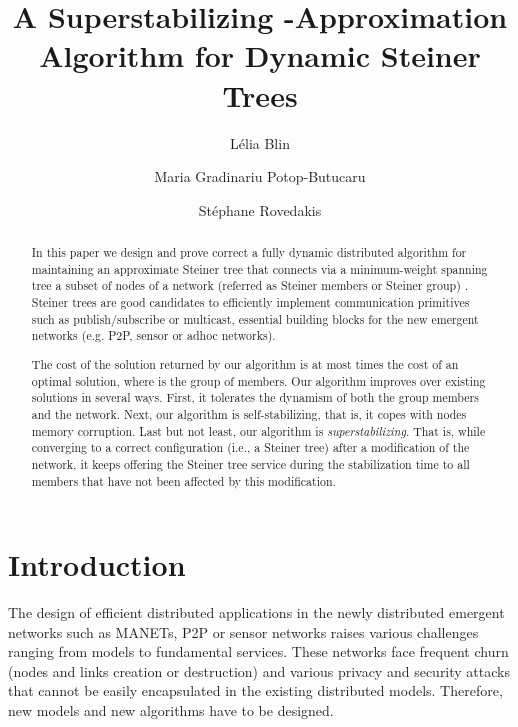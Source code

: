 \documentclass[11pt]{article}
\begin{document}
\title{A Superstabilizing -Approximation Algorithm for Dynamic Steiner Trees}

\author{
L\'{e}lia Blin 
\and
Maria Gradinariu Potop-Butucaru
\and
St\'{e}phane Rovedakis
}



\date{}


\maketitle

\begin{abstract}
In this paper we design and prove correct a fully dynamic distributed algorithm for maintaining an approximate Steiner 
 tree that connects via a minimum-weight spanning tree a 
subset of nodes of a network (referred as Steiner members or Steiner group) .
Steiner trees are good 
candidates to efficiently implement communication primitives such
as publish/subscribe or multicast, essential building blocks for the new
emergent networks (e.g. P2P, sensor or adhoc networks). 

The cost
of the solution returned by our algorithm is at most 
times the cost of an optimal solution, where  is the group of
members. Our algorithm improves over existing solutions in several
ways. First, it tolerates the dynamism of both the group members and
the network. Next, our algorithm is self-stabilizing, that is, it
copes with nodes memory
corruption. Last but not least, our algorithm is
\emph{superstabilizing}. 
That is, while converging to a correct
configuration (i.e., a Steiner tree) after a modification of the
network, it keeps offering the Steiner tree service during the
stabilization time to all members that have not been affected by
this modification.
\end{abstract}





\section{Introduction}

The design of efficient distributed applications in the newly distributed 
emergent networks such as MANETs, P2P or sensor networks raises 
various challenges ranging 
from models to fundamental services. These networks face frequent
churn (nodes and links creation or destruction) and various privacy
and security attacks that cannot be easily encapsulated in the
existing distributed models. 
Therefore, new models and new algorithms have to be designed. 
\end{document}
